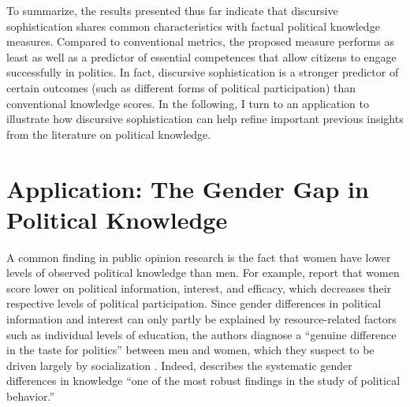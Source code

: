 To summarize, the results presented thus far indicate that discursive sophistication shares common characteristics with factual political knowledge measures. Compared to conventional metrics, the proposed measure performs as least as well as a predictor of essential competences that allow citizens to engage successfully in politics. In fact, discursive sophistication is a stronger predictor of certain outcomes (such as different forms of political participation) than conventional knowledge scores. In the following, I turn to an application to illustrate how discursive sophistication can help refine important previous insights from the literature on political knowledge.


\section{Application: The Gender Gap in Political Knowledge}

A common finding in public opinion research is the fact that women have lower levels of observed political knowledge than men. For example, \citet{verba1997knowing} report that women score lower on political information, interest, and efficacy, which decreases their respective levels of political participation. Since gender differences in political information and interest can only partly be explained by resource-related factors such as individual levels of education, the authors diagnose a ``genuine difference in the taste for politics'' between men and women, which they suspect to be driven largely by socialization \citep[see also][]{wolak2011roots}. Indeed, \citet[117]{dow2009gender} describes the systematic gender differences in knowledge ``one of the most robust findings in the study of political behavior.''

